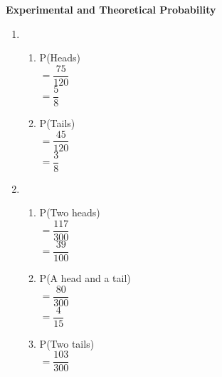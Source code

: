 \begin{center}
\textbf{Experimental and Theoretical Probability}\\
\end{center}

\vspace*{1ex}

\begin{enumerate}[label = \arabic*. ]
\item %
\begin{enumerate}[label = \alph*. ]
\item  P(Heads) \redcheck \\
$= \dfrac{75}{120}$ \redcheck \\ 
$= \dfrac{5}{8}$ \redcheck \\ 

\item  P(Tails) \redcheck \\ 
$= \dfrac{45}{120}$ \redcheck \\ 
$= \dfrac{3}{8}$ \redcheck \\ 

\end{enumerate}   
\item %


\begin{enumerate}[label = \alph*. ]
\item  P(Two heads) \redcheck \\ 
$= \dfrac{117}{300}$ \redcheck \\ 
$= \dfrac{39}{100}$ \redcheck \\ 
\item  P(A head and a tail) \redcheck \\ 
$= \dfrac{80}{300}$ \redcheck \\ 
$= \dfrac{4}{15}$ \redcheck \\ 
\item  P(Two tails) \redcheck \\ 
$= \dfrac{103}{300}$ \redcheck \\ 
\end{enumerate} 


\end{enumerate}
